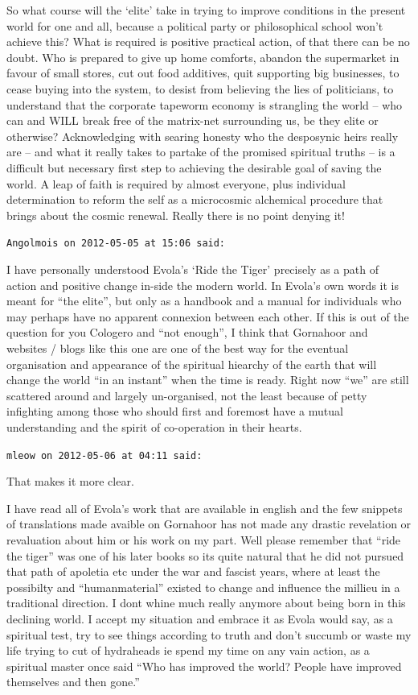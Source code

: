 \begin{footnotesize}
\begin{sffamily}
So what course will the `elite' take in trying to improve conditions in the present world for one and all, because a political party or philosophical school won't achieve this? What is required is positive practical action, of that there can be no doubt. Who is prepared to give up home comforts, abandon the supermarket in favour of small stores, cut out food additives, quit supporting big businesses, to cease buying into the system, to desist from believing the lies of politicians, to understand that the corporate tapeworm economy is strangling the world -- who can and WILL break free of the matrix-net surrounding us, be they elite or otherwise? Acknowledging with searing honesty who the desposynic heirs really are -- and what it really takes to partake of the promised spiritual truths -- is a difficult but necessary first step to achieving the desirable goal of saving the world. A leap of faith is required by almost everyone, plus individual determination to reform the self as a microcosmic alchemical procedure that brings about the cosmic renewal. Really there is no point denying it!

\hfill

\texttt{Angolmois on 2012-05-05 at 15:06 said:}

I have personally understood Evola's `Ride the Tiger' precisely as a path of action and positive change in-side the modern world. In Evola's own words it is meant for ``the elite'', but only as a handbook and a manual for individuals who may perhaps have no apparent connexion between each other. If this is out of the question for you Cologero and ``not enough'', I think that Gornahoor and websites / blogs like this one are one of the best way for the eventual organisation and appearance of the spiritual hiearchy of the earth that will change the world ``in an instant'' when the time is ready. Right now ``we'' are still scattered around and largely un-organised, not the least because of petty infighting among those who should first and foremost have a mutual understanding and the spirit of co-operation in their hearts.

\hfill

\texttt{mleow on 2012-05-06 at 04:11 said:}

That makes it more clear.

I have read all of Evola's work that are available in english and the few snippets of translations made avaible on Gornahoor has not made any drastic revelation or revaluation about him or his work on my part. Well please remember that ``ride the tiger'' was one of his later books so its quite natural that he did not pursued that path of apoletia etc under the war and fascist years, where at least the possibilty and ``humanmaterial'' existed to change and influence the millieu in a traditional direction. I dont whine much really anymore about being born in this declining world. I accept my situation and embrace it as Evola would say, as a spiritual test, try to see things according to truth and don't succumb or waste my life trying to cut of hydraheads ie spend my time on any vain action, as a spiritual master once said ``Who has improved the world? People have improved themselves and then gone.''


\end{sffamily}
\end{footnotesize}
